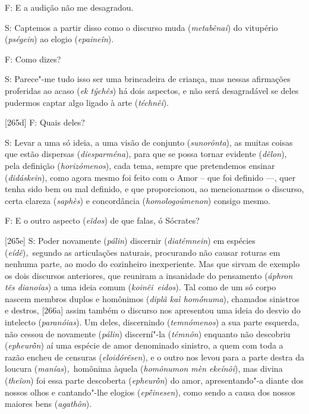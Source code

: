  

F: E a audição não me desagradou.

 

S: Captemos a partir disso como o discurso muda (\emph{metabênai}) do
vitupério (\emph{pségein}) ao elogio (\emph{epaineîn}).

 

F: Como dizes?

 

S: Parece"-me tudo isso ser uma brincadeira de criança, mas nessas
afirmações proferidas ao acaso (\emph{ek týchês}) há dois aspectos, e
não será desagradável se deles pudermos captar algo ligado à arte
(\emph{téchnêi}).

 

[265d] F: Quais deles?

 

S: Levar a uma só ideia, a uma visão de conjunto (\emph{sunorônta}), as
muitas coisas que estão dispersas (\emph{diesparména}), para que se
possa tornar evidente (\emph{dêlon}), pela definição
(\emph{horizómenos}), cada tema, sempre que pretendemos ensinar
(\emph{didáskein}), como agora mesmo foi feito com o Amor -- que foi
definido \mbox{---,} quer tenha sido bem ou mal definido, e que proporcionou, ao
mencionarmos o discurso, certa clareza (\emph{saphès}) e concordância
(\emph{homologoúmenon}) consigo mesmo.

 

F: E o outro aspecto (\emph{eîdos}) de que falas, ó Sócrates?

 

[265e] S: Poder novamente (\emph{pálin}) discernir
(\emph{diatémnein}) em espécies (\emph{eídê})\emph{,}~segundo as
articulações naturais, procurando não causar roturas em nenhuma parte,
ao modo do cozinheiro inexperiente. Mas que sirvam de exemplo os dois
discursos anteriores, que reuniram a insanidade do pensamento
(\emph{áphron tês dianoías}) a uma ideia comum
(\emph{koinêi}~\emph{eidos}). Tal como de um só corpo nascem membros
duplos e homônimos (\emph{diplâ kaì homṓnuma}), chamados sinistros e
destros, [266a] assim também o discurso nos apresentou uma ideia do
desvio do intelecto (\emph{paranóias}). Um deles, discernindo
(\emph{temnómenos}) a sua parte esquerda, não cessou de novamente
(\emph{pálin}) discerní"-la (\emph{témnôn}) enquanto não descobriu
(\emph{epheurṑn}) aí uma espécie de amor denominado sinistro, a quem com
toda a razão encheu de censuras (\emph{eloidórêsen}), e o outro nos
levou para a parte destra da loucura (\emph{manías})\emph{,}~homônima
àquela (\emph{homônumon mèn ekeínôi}), mas divina (\emph{theîon}) foi
essa parte descoberta (\emph{epheurṑn}) do amor, apresentando"-a diante
dos nossos olhos e cantando"-lhe elogios (\emph{epḗinesen}), como sendo a
causa dos nossos maiores bens (\emph{agathôn}).

